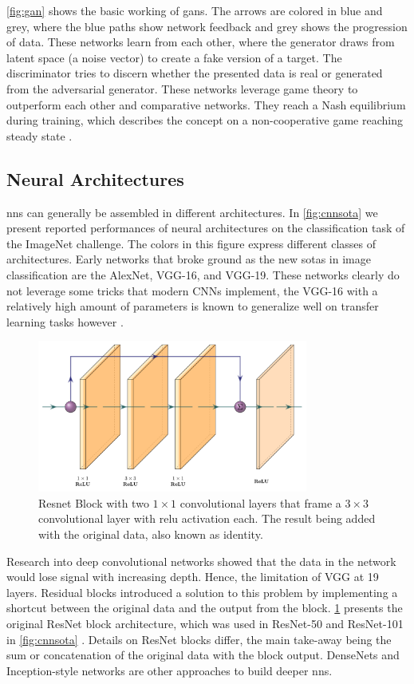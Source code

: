 \cref{fig:gan} shows the basic working of \acp{gan}. The arrows are colored in blue and grey, where the blue paths show network feedback and grey shows the progression of data. These networks learn from each other, where the generator draws from latent space (a noise vector) to create a fake version of a target. The discriminator tries to discern whether the presented data is real or generated from the adversarial generator. These networks leverage game theory to outperform each other and comparative networks. They reach a Nash equilibrium during training, which describes the concept on a non-cooperative game reaching steady state \citep{nash1951non}. 

\subsection{Neural Architectures}
\aclp{nn} can generally be assembled in different architectures. In \cref{fig:cnnsota} we present reported performances of neural architectures on the classification task of the ImageNet challenge. The colors in this figure express different classes of architectures. Early networks that broke ground as the new \aclp{sota} in image classification are the AlexNet, VGG-16, and VGG-19. These networks clearly do not leverage some tricks that modern CNNs implement, the VGG-16 with a relatively high amount of parameters is known to generalize well on transfer learning tasks however \citep{dramsch2018deep}. 

\begin{figure}
    \centering
    \includegraphics[width=\textwidth,height=5cm,keepaspectratio]{figures/resnet.pdf}
    \caption{Resnet Block with two $1\times1$ convolutional layers that frame a $3\times3$ convolutional layer with \ac{relu} activation each. The result being added with the original data, also known as identity.}
    \label{fig:resnet}
\end{figure}

Research into deep convolutional networks showed that the data in the network would lose signal with increasing depth. Hence, the limitation of VGG at 19 layers. Residual blocks introduced a solution to this problem by implementing a shortcut between the original data and the output from the block. \cref{fig:resnet} presents the original ResNet block architecture, which was used in ResNet-50 and ResNet-101 in \cref{fig:cnnsota} \citep{he2016deep}. Details on ResNet blocks differ, the main take-away being the sum or concatenation of the original data with the block output. DenseNets \citep{huang2017densely} and Inception-style networks \citep{szegedy2015going} are other approaches to build deeper \acp{nn}.

